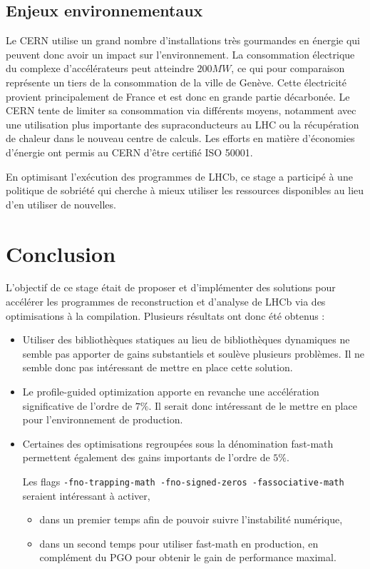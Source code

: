\documentclass[a4paper,11pt]{report}
\begin{document}
\section*{Enjeux environnementaux}
Le CERN utilise un grand nombre d'installations très gourmandes en énergie qui peuvent donc avoir un impact sur l'environnement.
La consommation électrique du complexe d'accélérateurs peut atteindre $200MW$, ce qui pour comparaison représente un tiers de la consommation de la ville de Genève.
Cette électricité provient principalement de France et est donc en grande partie décarbonée.
Le CERN tente de limiter sa consommation via différents moyens, notamment avec une utilisation plus importante des supraconducteurs au LHC ou la récupération de chaleur dans le nouveau centre de calculs.
Les efforts en matière d'économies d'énergie ont permis au CERN d'être certifié ISO 50001.

En optimisant l'exécution des programmes de LHCb, ce stage a participé à une politique de sobriété qui cherche à mieux utiliser les ressources disponibles au lieu d'en utiliser de nouvelles.


\chapter*{Conclusion}
L'objectif de ce stage était de proposer et d'implémenter des solutions pour accélérer les programmes de reconstruction et d'analyse de LHCb via des optimisations à la compilation.
Plusieurs résultats ont donc été obtenus :
\begin{itemize}
    \item Utiliser des bibliothèques statiques au lieu de bibliothèques dynamiques ne semble pas apporter de gains substantiels et soulève plusieurs problèmes.
          Il ne semble donc pas intéressant de mettre en place cette solution.
    \item Le profile-guided optimization apporte en revanche une accélération significative de l'ordre de $7\%$.
          Il serait donc intéressant de le mettre en place pour l'environnement de production.
    \item Certaines des optimisations regroupées sous la dénomination fast-math permettent également des gains importants de l'ordre de $5\%$.

          Les flags \verb'-fno-trapping-math -fno-signed-zeros -fassociative-math' seraient intéressant à activer,
          \begin{itemize}
              \item dans un premier temps afin de pouvoir suivre l'instabilité numérique,
              \item dans un second temps pour utiliser fast-math en production, en complément du PGO pour obtenir le gain de performance maximal.
          \end{itemize}
\end{itemize}
\end{document}
